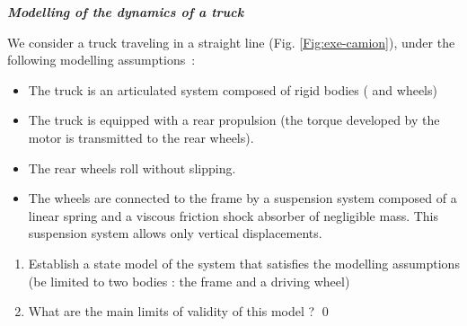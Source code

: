 \begin{exercice}{\bf \em Modelling of the dynamics of a truck}

We consider a truck traveling in a straight line (Fig. \ref{Fig:exe-camion}), under the following modelling assumptions~:
\begin{itemize}
\item[a)] The truck is an articulated system composed of rigid bodies ( and wheels)
\item[b)] The truck is equipped with a rear propulsion (the torque developed by
the motor is transmitted to the rear wheels).
\item[c)] The rear wheels roll without slipping.
\item[d)] The wheels are connected to the frame by a suspension system composed of a linear spring and a viscous friction shock absorber of negligible mass. This suspension system allows only vertical displacements.
\end{itemize}
\begin{enumerate}
\item Establish a state model of the system that satisfies the modelling assumptions (be limited to two bodies : the frame and a driving wheel)
\item What are the main limits of validity of this model ? \qed
\end{enumerate}
\end{exercice}
\vv

